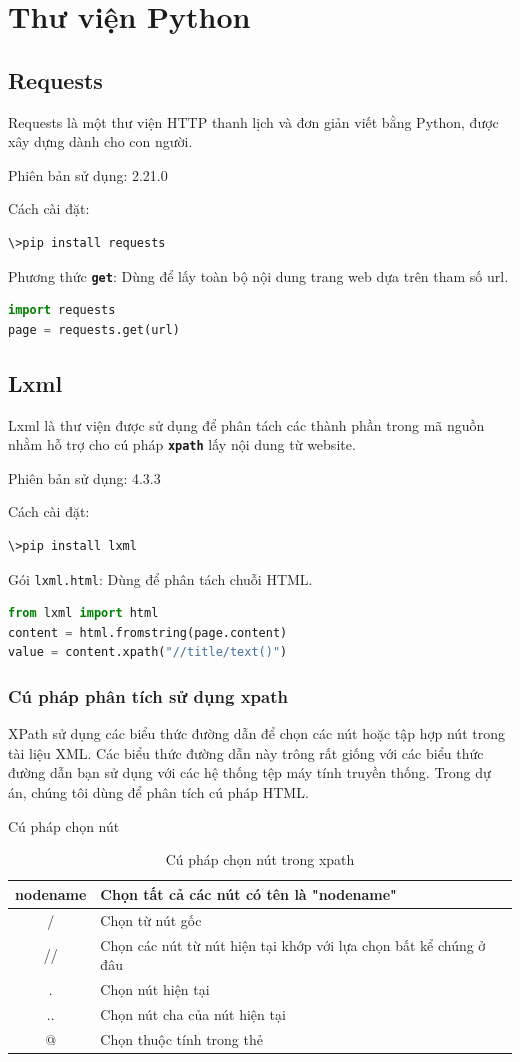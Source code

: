 \section{Thư viện Python}
\subsection{Requests}
Requests là một thư viện HTTP thanh lịch và đơn giản viết bằng Python, được xây dựng dành cho con người\cite{requests}.
\par
Phiên bản sử dụng: 2.21.0
\par
Cách cài đặt:
\begin{lstlisting}[language=bash]
\>pip install requests
\end{lstlisting}
\par
Phương thức \textbf{\texttt{get}}: Dùng để lấy toàn bộ nội dung trang web dựa trên tham số url.
\begin{lstlisting}[language=Python]
import requests
page = requests.get(url)
\end{lstlisting}
\subsection{Lxml}
Lxml là thư viện được sử dụng để phân tách các thành phần trong mã nguồn nhằm hỗ trợ cho cú pháp \textbf{\texttt{xpath}} lấy nội dung từ website\cite{lxml}.
\par
Phiên bản sử dụng: 4.3.3
\par
Cách cài đặt:
\begin{lstlisting}[language=bash]
\>pip install lxml
\end{lstlisting}
Gói \texttt{lxml.html}: Dùng để phân tách chuỗi HTML.
\begin{lstlisting}[language=Python]
from lxml import html
content = html.fromstring(page.content)
value = content.xpath("//title/text()")
\end{lstlisting}
\subsubsection{Cú pháp phân tích sử dụng xpath}
XPath sử dụng các biểu thức đường dẫn để chọn các nút hoặc tập hợp nút trong tài liệu XML. Các biểu thức đường dẫn này trông rất giống với các biểu thức đường dẫn bạn sử dụng với các hệ thống tệp máy tính truyền thống. Trong dự án, chúng tôi dùng để phân tích cú pháp HTML\cite{xpath}.
\par
Cú pháp chọn nút
\begin{table}[!ht]
	\centering
	\begin{tabular}{|c|l|}
		\hline
		nodename & Chọn tất cả các nút có tên là "nodename"\\
		\hline
		/ & Chọn từ nút gốc\\
		\hline
		// & Chọn các nút từ nút hiện tại khớp với lựa chọn bất kể chúng ở đâu\\
		\hline
		. & Chọn nút hiện tại\\
		\hline
		.. & Chọn nút cha của nút hiện tại\\
		\hline
		@ & Chọn thuộc tính trong thẻ\\
		\hline
	\end{tabular}
	\caption{Cú pháp chọn nút trong xpath}
\end{table}
